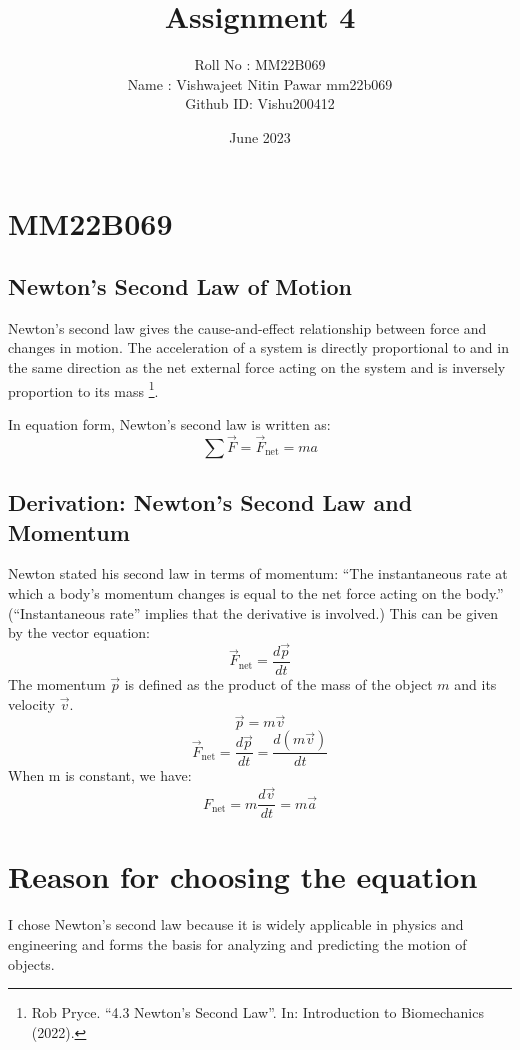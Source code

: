 \documentclass{article}
\title{Assignment 4}
\author{Roll No : MM22B069 \\ Name : Vishwajeet Nitin Pawar mm22b069 \\ Github ID: Vishu200412}
\date{June 2023}
\begin{document}
\maketitle
\begin{center}
    
\end{center}
\section*{MM22B069}
\subsection*{Newton's Second Law of Motion}
Newton's second law gives the cause-and-effect relationship between force and changes in motion. The acceleration of a system is directly proportional to and in the same direction as the net external force acting on the system and is inversely proportion to its mass \footnote{Rob Pryce. “4.3 Newton’s Second Law”. In: Introduction to Biomechanics
(2022).}.

\noindent 
In equation form, Newton’s second law is written as:
\[\sum \vec{F} = \vec{F}_{\text{net}} = ma\]
\subsection*{Derivation: Newton’s Second Law and Momentum}
Newton stated his second law in terms of momentum: “The instantaneous rate at which a body’s momentum changes is equal to the net force acting on the body.” (“Instantaneous rate” implies that the derivative is involved.) This can be given by the vector equation:
\[\vec{F}_{\text{net}} = \frac{d\vec{p}}{dt}\]
The momentum \(\vec{p}\) is defined as the product of the mass of the object \(m\) and its velocity \(\vec{v}\).
\[\vec{p} = m\vec{v}\]
\[\vec{F}_{\text{net}} = \frac{d\vec{p}}{dt} = \frac{d(m\vec{v})}{dt}\]
When m is constant, we have:
\[F_{\text{net}} = m\frac{d\vec{v}}{dt} = m\vec{a}\]
\section*{Reason for choosing the equation}
I chose Newton's second law because it is widely applicable in physics and engineering and forms the basis for analyzing and predicting the motion of objects.
\end{document}
